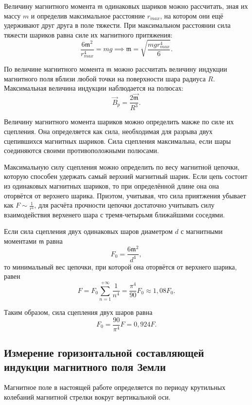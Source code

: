 \documentclass[a4paper,10pt]{article}
\begin{document}
Величину магнитного момента $\mathfrak{m}$ одинаковых шариков можно рассчитать, зная их массу $m$ и определив максимальное расстояние $r_{max}$, на котором они ещё удерживают друг друга в поле тяжести. При максимальном расстоянии сила тяжести шариков равна силе их магнитного притяжения:\[\frac{6\mathfrak{m}^2}{r_{max}^4}=mg\implies\mathfrak{m}=\sqrt{\frac{mgr_{max}^4}{6}}.\]

По величине магнитного момента $\mathfrak{m}$ можно рассчитать величину индукции магнитного поля вблизи любой точки на поверхности шара радиуса $R$. Максимальная величина индукции наблюдается на полюсах:\[\vec{B}_p=\frac{2\vec{\mathfrak{m}}}{R^3}.\]

Величину магнитного момента шариков можно определить макже по силе их сцепления. Она определяется как сила, необходимая для разрыва двух сцепившихся магнитных шариков. Сила сцепления максимальна, если шары соединяются своими противоположными полюсами.

Максимальную силу сцепления можно определить по весу магнитной цепочки, которую способен удержать самый верхний магнитный шарик. Если цепь состоит из одинаковых магнитных шариков, то при определённой длине она она оторвётся от верхнего шарика. Приэтом, учитывая, что сила приятжения убывает как $F\sim\frac{1}{r^4}$, для расчёта прочности цепочки достаточно учитывать силу взаимодействия верхенего шара с тремя-четырьмя ближайшими соседями.

Если сила сцепления двух одинаковых шаров диаметром $d$ с магнитными моментами $\mathfrak{m}$ равна\[F_0=\frac{6\mathfrak{m}^2}{d^4},\]то минимальный вес цепочки, при которой она оторвётся от верхнего шарика, равен\[F=F_0\sum_{n=1}^{+\infty}\frac{1}{n^4}=\frac{\pi^4}{90}F_0\approx1,08F_0.\]

Таким образом, сила сцепления двух шаров равна\[F_0=\frac{90}{\pi^4}F=0,924F.\]

\subsection*{Измерение горизонтальной составляющей индукции магнитного поля Земли}

Магнитное поле в настоящей работе определяется по периоду крутильных колебаний магнитной стрелки вокруг вертикальной оси.
\end{document}
